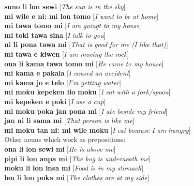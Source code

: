 \documentclass[10pt,a4paper]{article}
\begin{document}
\begin{multicols}{2}
\noindent\textbf{suno li lon sewi} [\textit{The sun is in the sky}]\\
\noindent\textbf{mi wile e ni: mi lon tomo} [\textit{I want to be at home}]\\
\noindent\textbf{mi tawa tomo mi} [\textit{I am goingt to my house}]\\
\noindent\textbf{mi toki tawa sina} [\textit{I talk to you}]\\
\noindent\textbf{ni li pona tawa mi} [\textit{That is good for me (I like that)}]\\
\noindent\textbf{mi tawa e kiwen} [\textit{I am moving the rock}]\\
\noindent\textbf{ona li kama tawa tomo mi} [\textit{He came to my house}]\\
\noindent\textbf{mi kama e pakala} [\textit{I caused an accident}]\\
\noindent\textbf{mi kama jo e telo} [\textit{I'm getting water}]\\
\noindent\textbf{mi moku kepeken ilo moku} [\textit{I eat with a fork/spoon}]\\
\noindent\textbf{mi kepeken e poki} [\textit{I use a cup}]\\
\noindent\textbf{mi moku poka jan pona mi} [\textit{I ate beside my friend}]\\
\noindent\textbf{jan ni li sama mi} [\textit{That person is like me}]\\
\noindent\textbf{mi moku tan ni: mi wile moku} [\textit{I eat because I am hungry}]\\
\noindent Other nouns which work as prepositions:\\
\noindent\textbf{ona li lon sewi mi} [\textit{He is above me}]\\
\noindent\textbf{pipi li lon anpa mi} [\textit{The bug is underneath me}]\\
\noindent\textbf{moku li lon insa mi} [\textit{Food is in my stomach}]\\
\noindent\textbf{len li lon poka mi} [\textit{The clothes are at my side}]
\end{multicols}
\end{document}
